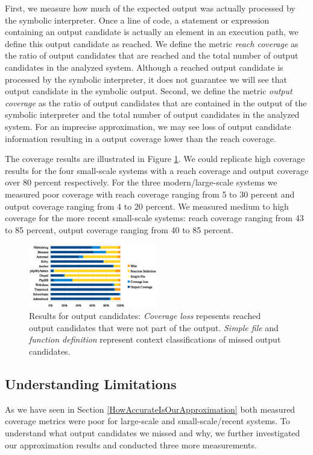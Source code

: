 \documentclass[preprint]{sig-alternate-05-2015}
\begin{document}
First, we measure how much of the expected output was actually processed by the symbolic interpreter.  Once a line of code, a statement or expression containing an output candidate is actually an element in an execution path, we define this output candidate as reached. We define the metric \emph{reach coverage} as the ratio of output candidates that are reached and the total number of output candidates in the analyzed system. Although a reached output candidate is processed by the symbolic interpreter, it does not guarantee we will see that output candidate in the symbolic output. Second, we define the metric \emph{output coverage} as the ratio of output candidates that are contained in the output of the symbolic interpreter and the total number of output candidates in the analyzed system.  For an imprecise approximation, we may see loss of output candidate information resulting in a output coverage lower than the reach coverage.

The coverage results are illustrated in Figure \ref{coverage}. We could replicate high coverage results for the four small-scale systems with a reach coverage and output coverage over 80 percent respectively. For the three modern/large-scale systems we measured poor coverage with reach coverage ranging from 5 to 30 percent and output coverage ranging from 4 to 20 percent. We measured medium to high coverage for the more recent small-scale systems: reach coverage ranging from 43 to 85 percent, output coverage ranging from 40 to 85 percent.
\begin{figure}
	\centering	
%			
	\includegraphics[width=0.5\textwidth]{images-paper/coverage.eps}
	\caption{
		Results for output candidates: \emph{Coverage loss} repesents reached output candidates that were not part of the output. \emph{Simple file} and \emph{function definition} represent context classifications of missed output candidates.
	}
	\label{coverage}
\end{figure}

\subsection{Understanding Limitations}
As we have seen in Section \ref{HowAccurateIsOurApproximation} both measured coverage metrics were poor for large-scale and small-scale/recent systems. To understand what output candidates we missed and why, we further investigated our approximation results and conducted three more measurements. 
\end{document}
